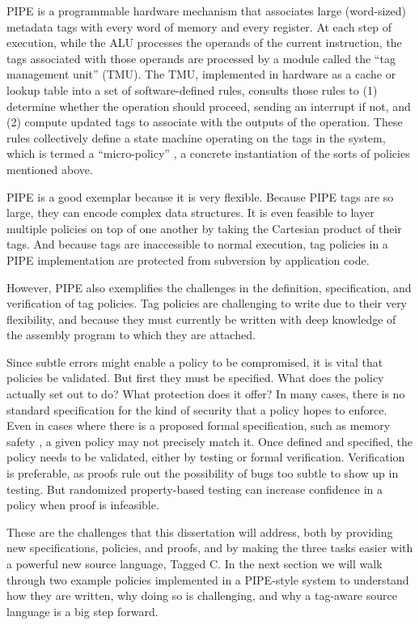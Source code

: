 PIPE is a programmable hardware mechanism that associates large (word-sized) metadata tags
with every word of memory and every register. At each step of execution, while the ALU processes
the operands of the current instruction, the tags associated with those operands are processed
by a module called the ``tag management unit'' (TMU).
The TMU, implemented in hardware as a cache or lookup table into a set of software-defined rules,
consults those rules to (1) determine whether the operation should
proceed, sending an interrupt if not, and (2) compute updated tags to associate with the
outputs of the operation. These rules collectively define a state machine operating on the
tags in the system, which is termed a ``micro-policy'' \cite{Azevedo+15}, a concrete instantiation of the
sorts of policies mentioned above.

PIPE is a good exemplar because it is very flexible. Because PIPE tags are so large,
they can encode complex data structures. It is even feasible to layer
multiple policies on top of one another by taking the Cartesian product of their tags.
And because tags are inaccessible to normal execution, tag policies in a PIPE implementation
are protected from subversion by application code.

However, PIPE also exemplifies the challenges in the definition, specification, and
verification of tag policies. Tag policies are challenging to write due to their very
flexibility, and because they must currently be written with deep knowledge of the assembly
program to which they are attached.

Since subtle errors might enable a policy to be compromised,
it is vital that policies be validated. But first they must be specified. What does the
policy actually set out to do? What protection does it offer?
In many cases, there is no standard specification for the kind of security that a policy hopes
to enforce. Even in cases where there is a proposed formal specification, such as
memory safety \cite{Azevedo+16}, a given policy may not precisely match it. 
Once defined and specified, the policy needs to be validated, either by testing or formal
verification. Verification is preferable, as proofs rule out the possibility of bugs too
subtle to show up in testing. But randomized property-based testing can increase confidence
in a policy when proof is infeasible.

These are the challenges that this dissertation will address, both by 
providing new specifications, policies, and proofs, and by making the three tasks
easier with a powerful new source language, Tagged C.
In the next section we will walk through two example policies implemented in a PIPE-style
system to understand how they are written, why doing so is challenging,
and why a tag-aware source language is a big step forward.

